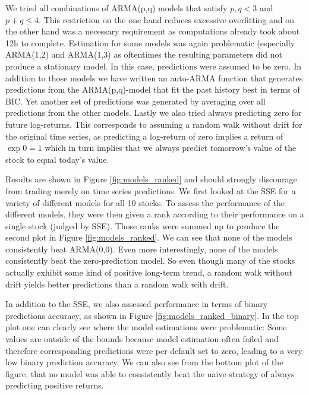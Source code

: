 We tried all combinations of ARMA(p,q) models that satisfy $p,q < 3$ and $p+q \leq 4$. This restriction on the one hand reduces excessive overfitting and on the other hand was a necessary requirement as computations already took about 12h to complete. Estimation for some models was again problematic (especially ARMA(1,2) and ARMA(1,3) as oftentimes the resulting parameters did not produce a stationary model. In this case, predictions were assumed to be zero. In addition to those models we have written an auto-ARMA function that generates predictions from the ARMA(p,q)-model that fit the past history best in terms of BIC. Yet another set of predictions was generated by averaging over all predictions from the other models. Lastly we also tried always predicting zero for future log-returns. This corresponds to assuming a random walk without drift for the original time series, as predicting a log-return of zero implies a return of $\exp{0} = 1$ which in turn implies that we always predict tomorrow's value of the stock to equal today's value. 

Results are shown in Figure \ref{fig:models_ranked} and should strongly discourage from trading merely on time series predictions. We first looked at the SSE for a variety of different models for all 10 stocks. To assess the performance of the different models, they were then given a rank according to their performance on a single stock (judged by SSE). Those ranks were summed up to produce the second plot in Figure \ref{fig:models_ranked}. We can see that none of the models consistently beat ARMA(0,0). Even more interestingly, none of the models consistently beat the zero-prediction model. So even though many of the stocks actually exhibit some kind of positive long-term trend, a random walk without drift yields better predictions than a random walk with drift. 

In addition to the SSE, we also assessed performance in terms of binary predictions accuracy, as shown in Figure \ref{fig:models_ranked_binary}. In the top plot one can clearly see where the model estimations were problematic: Some values are outside of the bounds because model estimation often failed and therefore corresponding predictions were per default set to zero, leading to a very low binary prediction accuracy. We can also see from the bottom plot of the figure, that no model was able to consistently beat the naive strategy of always predicting positive returns. 

